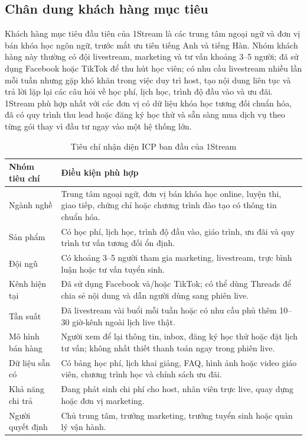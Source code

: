 \subsection{Chân dung khách hàng mục tiêu}

Khách hàng mục tiêu đầu tiên của 1Stream là các trung tâm ngoại ngữ và đơn vị
bán khóa học ngôn ngữ, trước mắt ưu tiên tiếng Anh và tiếng Hàn. Nhóm khách hàng
này thường có đội livestream, marketing và tư vấn khoảng 3--5 người; đã sử dụng
Facebook hoặc TikTok để thu hút học viên; có nhu cầu livestream nhiều lần mỗi
tuần nhưng gặp khó khăn trong việc duy trì host, tạo nội dung liên tục và trả lời
lặp lại các câu hỏi về học phí, lịch học, trình độ đầu vào và ưu đãi. 1Stream phù
hợp nhất với các đơn vị có dữ liệu khóa học tương đối chuẩn hóa, đã có quy trình
thu lead hoặc đăng ký học thử và sẵn sàng mua dịch vụ theo từng gói thay vì đầu
tư ngay vào một hệ thống lớn.

\begin{table}[H]
    \centering
    \small
    \setlength{\tabcolsep}{5pt}
    \renewcommand{\arraystretch}{1.25}
    \caption{Tiêu chí nhận diện ICP ban đầu của 1Stream}
    \label{tab:icp-1stream}
    \begin{tabularx}{\linewidth}{@{}L{3.2cm}Y@{}}
        \toprule
        \textbf{Nhóm tiêu chí} & \textbf{Điều kiện phù hợp} \\ \midrule
        Ngành nghề & Trung tâm ngoại ngữ, đơn vị bán khóa học online, luyện thi,
        giao tiếp, chứng chỉ hoặc chương trình đào tạo có thông tin chuẩn hóa. \\
        Sản phẩm & Có học phí, lịch học, trình độ đầu vào, giáo trình, ưu đãi và
        quy trình tư vấn tương đối ổn định. \\
        Đội ngũ & Có khoảng 3--5 người tham gia marketing, livestream, trực bình
        luận hoặc tư vấn tuyển sinh. \\
        Kênh hiện tại & Đã sử dụng Facebook và/hoặc TikTok; có thể dùng Threads
        để chia sẻ nội dung và dẫn người dùng sang phiên live. \\
        Tần suất & Đã livestream vài buổi mỗi tuần hoặc có nhu cầu phủ thêm
        10--30 giờ-kênh ngoài lịch live thật. \\
        Mô hình bán hàng & Người xem để lại thông tin, inbox, đăng ký học thử
        hoặc đặt lịch tư vấn; không nhất thiết thanh toán ngay trong phiên live. \\
        Dữ liệu sẵn có & Có bảng học phí, lịch khai giảng, FAQ, hình ảnh hoặc
        video giáo viên, chương trình học và chính sách ưu đãi. \\
        Khả năng chi trả & Đang phát sinh chi phí cho host, nhân viên trực live,
        quay dựng hoặc đơn vị marketing. \\
        Người quyết định & Chủ trung tâm, trưởng marketing, trưởng tuyển sinh
        hoặc quản lý vận hành. \\ \bottomrule
    \end{tabularx}
\end{table}

